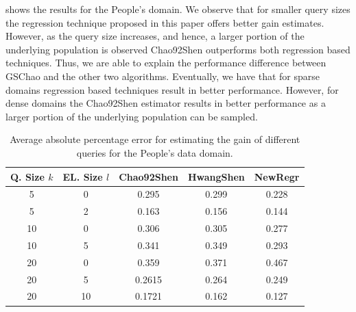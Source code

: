  shows the results for the People's domain. We observe that for smaller query sizes the regression technique proposed in this paper offers better gain estimates. However, as the query size increases, and hence, a larger portion of the underlying population is observed Chao92Shen outperforms both regression based techniques. Thus, we are able to explain the performance difference between GSChao and the other two algorithms. Eventually, we have that for sparse domains regression based techniques result in better performance. However, for dense domains the Chao92Shen estimator results in better performance as a larger portion of the underlying population can be sampled. 

\begin{table}[h]
\vspace{-5pt}
\scriptsize \center
\caption{Average absolute percentage error for estimating the gain of different queries for the People's data domain.}
\vspace{-5pt}
\label{tab:peopleesterror}
\begin{tabular}{|c|c|c|c|c|}
\hline
\textbf{Q. Size $k$} & \textbf{EL. Size $l$} & \textbf{Chao92Shen} & \textbf{HwangShen} & \textbf{NewRegr} \\ \hline
5 & 0 & 0.295 & 0.299 & 0.228\\
5 & 2 & 0.163 &  0.156 & 0.144\\
10 & 0 &  0.306 & 0.305 & 0.277\\
10 & 5 &  0.341 & 0.349 & 0.293\\
20 & 0 &  0.359& 0.371 & 0.467 \\
20 & 5 &  0.2615 & 0.264 & 0.249\\
20 & 10 & 0.1721 & 0.162 & 0.127\\
\hline
\end{tabular}
\vspace{-15pt}
\end{table}


